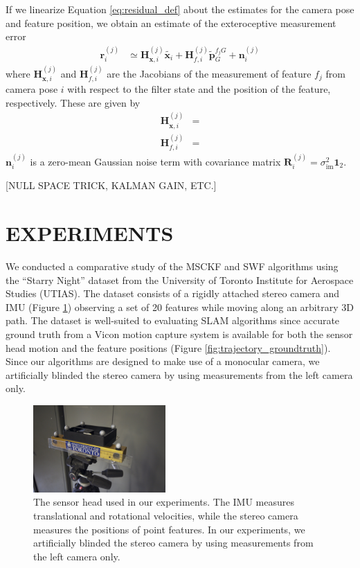 \documentclass[letterpaper, 10 pt, conference]{ieeeconf}  %
\def\Vec#1{\mathbf{#1}}
\begin{document}
If we linearize Equation \ref{eq:residual_def} about the estimates for the camera pose and feature position, we obtain an estimate of the exteroceptive measurement error
\begin{align}
    \Vec{r}_i^{(j)} &\simeq \Vec{H}_{\Vec{x}, i}^{(j)} \widetilde{\Vec{x}_i} + \Vec{H}_{f, i}^{(j)} \widetilde{\Vec{p}}_G^{f_j G} + \Vec{n}_i^{(j)}
\end{align}
where $\Vec{H}_{\Vec{x}, i}^{(j)}$ and $\Vec{H}_{f, i}^{(j)}$ are the Jacobians of the measurement of feature $f_j$ from camera pose $i$ with respect to the filter state and the position of the feature, respectively.
These are given by
\begin{align}
    \Vec{H}_{\Vec{x}, i}^{(j)} &=   \\
    \Vec{H}_{f, i}^{(j)} &= 
\end{align}
$\Vec{n}_i^{(j)}$ is a zero-mean Gaussian noise term with covariance matrix $\Vec{R}_i^{(j)} = \sigma^2_{\text{im}} \Vec{1}_{2}$.

[NULL SPACE TRICK, KALMAN GAIN, ETC.]

\section{EXPERIMENTS} \label{sec:experiments}
We conducted a comparative study of the MSCKF and SWF algorithms using the ``Starry Night'' dataset from the University of Toronto Institute for Aerospace Studies (UTIAS).
The dataset consists of a rigidly attached stereo camera and IMU (Figure \ref{fig:sensorhead}) observing a set of 20 features while moving along an arbitrary 3D path.
The dataset is well-suited to evaluating SLAM algorithms since accurate ground truth from a Vicon motion capture system is available for both the sensor head motion and the feature positions (Figure \ref{fig:trajectory_groundtruth}).
Since our algorithms are designed to make use of a monocular camera, we artificially blinded the stereo camera by using measurements from the left camera only.

\begin{figure}
    \centering
    \includegraphics[width=0.45\textwidth]{figs/sensorhead}
    \caption{The sensor head used in our experiments. The IMU measures translational and rotational velocities, while the stereo camera measures the positions of point features. In our experiments, we artificially blinded the stereo camera by using measurements from the left camera only.}
    \label{fig:sensorhead}
\end{figure}
\end{document}

